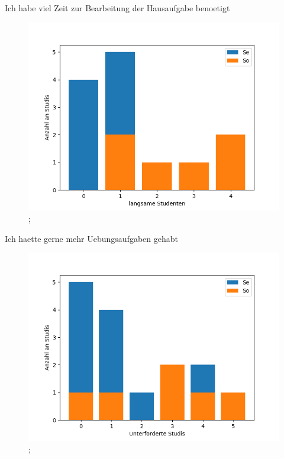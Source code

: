 \documentclass[10pt]{beamer}
\begin{document}
\begin{frame}[fragile]{Ich habe viel Zeit zur Bearbeitung der Hausaufgabe benoetigt} 
 \begin{figure}
 \includegraphics[width= 0.9\linewidth]{./PDFcreater/Plots/Nx/Ich+habe+viel+Zeit+zur+Bearbeitung+der+Hausaufgabe+benoetigt.png};
 \end{figure}
 \end{frame}
\begin{frame}[fragile]{Ich haette gerne mehr Uebungsaufgaben gehabt} 
 \begin{figure}
 \includegraphics[width= 0.9\linewidth]{./PDFcreater/Plots/Nx/Ich+haette+gerne+mehr+Uebungsaufgaben+gehabt.png};
 \end{figure}
 \end{frame}
\end{document}
